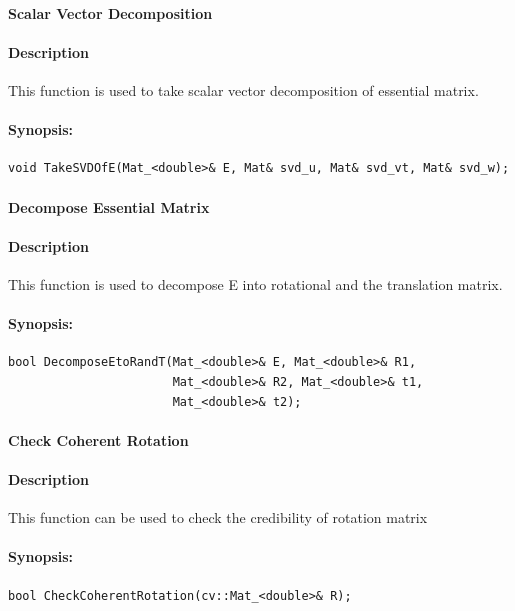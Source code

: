 \paragraph{Scalar Vector Decomposition}
\paragraph{Description}
 This function is used to take scalar vector decomposition of essential matrix.
\paragraph{Synopsis:}
\begin{lstlisting}
void TakeSVDOfE(Mat_<double>& E, Mat& svd_u, Mat& svd_vt, Mat& svd_w);
\end{lstlisting}




\paragraph{ Decompose Essential Matrix }
\paragraph{Description}
This function is used to decompose E into rotational and the translation matrix.
\paragraph{Synopsis:}
\begin{lstlisting}
bool DecomposeEtoRandT(Mat_<double>& E, Mat_<double>& R1,
                       Mat_<double>& R2, Mat_<double>& t1,
                       Mat_<double>& t2);
\end{lstlisting}

\paragraph{ Check Coherent Rotation }
\paragraph{Description}
 This function can be used to check the credibility of rotation matrix 
\paragraph{Synopsis:}
\begin{lstlisting}
bool CheckCoherentRotation(cv::Mat_<double>& R);
\end{lstlisting}
